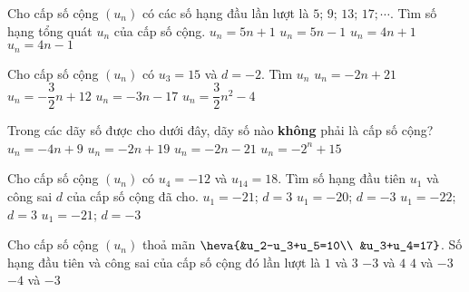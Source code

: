 \begin{ex}%
	Cho cấp số cộng $(u_n )$ có các số hạng đầu lần lượt là $5;\,9;\,13;\,17;\cdots $. Tìm số hạng tổng quát $u_n$ của cấp số cộng.
	\choice
	{$u_n=5n+1$}
	{$u_n=5n-1$}
	{\True $u_n=4n+1$}
	{$u_n=4n-1$}
\end{ex}

\begin{ex}%
	Cho cấp số cộng $(u_n)$ có $u_3=15$ và $d=-2$. Tìm $u_n$
	\choice
	{\True $u_n=-2n+21$}
	{$u_n=-\dfrac{3}{2}n+12$}
	{$u_n=-3n-17$}
	{$u_n=\dfrac{3}{2}{{n}^2}-4$}
\end{ex}

\begin{ex}%
	Trong các dãy số được cho dưới đây, dãy số nào {\bf không} phải là cấp số cộng?
	\choice
	{$u_n=-4n+9$}
	{$u_n=-2n+19$}
	{$u_n=-2n-21$}
	{\True $u_n=-2^n+15$}
\end{ex}

\begin{ex}%
	Cho cấp số cộng $(u_n)$ có $u_4=-12$ và $u_{14}=18$. Tìm số hạng đầu tiên $u_1$ và công sai $d$ của cấp số cộng đã cho.
	\choice
	{\True $u_1=-21$; $d=3$}
	{$u_1=-20$; $d=-3$}
	{$u_1=-22$; $d=3$}
	{$u_1=-21$; $d=-3$}
\end{ex}

\begin{ex}%
	Cho cấp số cộng $(u_n)$ thoả mãn $\heva{&u_2-u_3+u_5=10\\ &u_3+u_4=17}$. Số hạng đầu tiên và công sai của cấp số cộng đó lần lượt là
	\choice
	{\True $1$ và $3$}
	{$-3$ và $4$}
	{$4$ và $-3$}
	{$-4$ và $-3$}
\end{ex}

